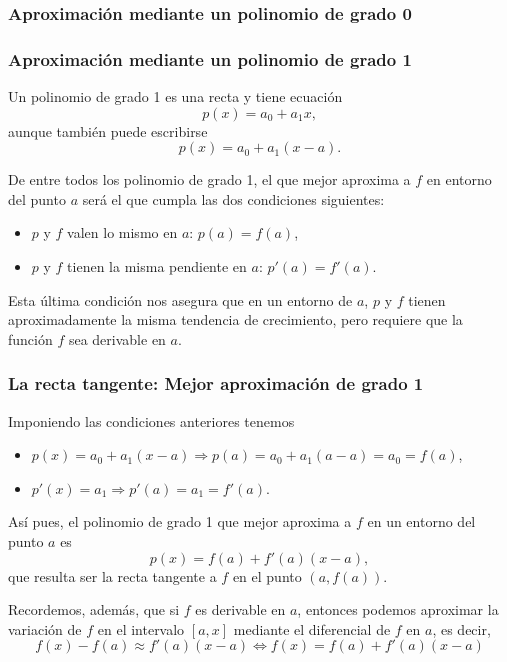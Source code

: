 \begin{frame}
\frametitle{Aproximación mediante un polinomio de grado 0}
\begin{center}
\scalebox{1}{}
\end{center}
\end{frame}


\begin{frame}
\frametitle{Aproximación mediante un polinomio de grado 1}
Un polinomio de grado 1 es una recta y tiene ecuación
\[p(x) = a_0+a_1x,\]
aunque también puede escribirse
\[p(x) = a_0+a_1(x-a).\]

De entre todos los polinomio de grado 1, el que mejor aproxima a $f$ en entorno del punto $a$ será el que cumpla las dos condiciones siguientes:
\begin{itemize}
\item[\structure{1-}] $p$ y $f$ valen lo mismo en $a$: $p(a) = f (a)$,
\item[\structure{2-}] $p$ y $f$ tienen la misma pendiente en $a$: $p'(a) = f '(a)$.
\end{itemize}
Esta última condición nos asegura que en un entorno de $a$, $p$ y $f$ tienen aproximadamente la misma tendencia de crecimiento, pero requiere que la función $f$ sea derivable en $a$.
\end{frame}


\begin{frame}
\frametitle{La recta tangente: Mejor aproximación de grado 1}
Imponiendo las condiciones anteriores tenemos
\begin{itemize}
\item[\structure{1-}] $p(x)=a_0+a_1(x-a) \Rightarrow p(a)=a_0+a_1(a-a)=a_0=f(a)$,
\item[\structure{2-}] $p'(x)=a_1 \Rightarrow p'(a)=a_1=f'(a)$.
\end{itemize}

Así pues, el polinomio de grado 1 que mejor aproxima a $f$ en un entorno del punto $a$ es
\[p(x) = f(a)+f '(a)(x-a),\]
que resulta ser la recta tangente a $f$ en el punto $(a,f(a))$.

Recordemos, además, que si $f$ es derivable en $a$, entonces podemos aproximar la variación de $f$ en el intervalo $[a,x]$ mediante el diferencial de $f$ en $a$, es decir,
\[f(x)-f(a) \approx f'(a)(x-a)\Leftrightarrow f(x)=f(a)+f'(a)(x-a)\]
\end{frame}


